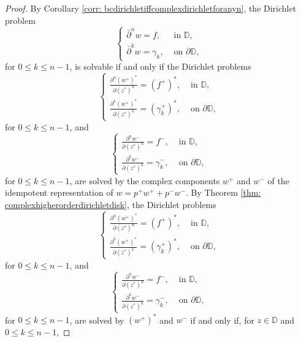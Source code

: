 \documentclass[12pt,reqno]{amsart}
\theoremstyle{definition}
\theoremstyle{remark}
\newcommand{\p}{\partial}
\newcommand{\dbar}{\bar\partial}
\newcommand{\disk}{\mathbb{D}}
\begin{document}
            \begin{proof}

                By Corollary \ref{corr: bcdirichletiffcomplexdirichletforanyn}, the Dirichlet problem 
                \[
                    \begin{cases}
                        \dbar^n w = f, & \text{ in } \disk,\\
                        \dbar^k w = \gamma_k, & \text{ on } \p\disk,
                    \end{cases}
                \]
                for $0 \leq k \leq n-1$, is solvable if and only if the Dirichlet problems
                \[
                    \begin{cases}
                        \frac{\p^n (w^+)^*}{\p (z^*)^n} = (f^+)^*, & \text{ in } \disk,\\
                        \frac{\p^k (w^+)^*}{\p (z^*)^k} = (\gamma_k^+)^*, & \text{ on } \p\disk,
                    \end{cases}
                \]
                for $0 \leq k \leq n-1$, and
                \[
                    \begin{cases}
                         \frac{\p^n w^-}{\p (z^*)^n} = f^-, & \text{ in } \disk,\\
                        \frac{\p^k w^-}{\p (z^*)^k} = \gamma_k^-, & \text{ on } \p\disk,
                    \end{cases}
                \]
                for $0 \leq k \leq n-1$, are solved by the complex components $w^+$ and $w^-$ of the idempotent representation of $w = p^+ w^+ + p^- w^-$. By Theorem \ref{thm: complexhigherorderdirichletdisk}, the Dirichlet problems
                \[
                    \begin{cases}
                        \frac{\p^n (w^+)^*}{\p (z^*)^n} = (f^+)^*, & \text{ in } \disk,\\
                        \frac{\p^k (w^+)^*}{\p (z^*)^k} = (\gamma_k^+)^*, & \text{ on } \p\disk,
                    \end{cases}
                \]
                for $0 \leq k \leq n-1$, and
                \[
                    \begin{cases}
                         \frac{\p^n w^-}{\p (z^*)^n} = f^-, & \text{ in } \disk,\\
                        \frac{\p^k w^-}{\p (z^*)^k} = \gamma_k^-, & \text{ on } \p\disk,
                    \end{cases}
                \]
                for $0 \leq k \leq n-1$, are solved by $(w^+)^*$ and $w^-$ if and only if, for $z \in \disk$ and $0 \leq k \leq n-1$, 

\end{proof}
\end{document}
